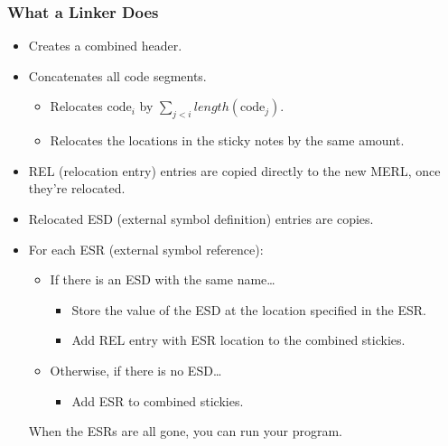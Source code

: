 \documentclass[]{article}
\theoremstyle{definition}
\begin{document}
			\subsubsection{What a Linker Does}
				\begin{itemize}
					\item Creates a combined header.
					\item Concatenates all code segments.
						\begin{itemize}
							\item Relocates $\text{code}_i$ by $\sum_{j < i} length(\text{code}_j)$.
							\item Relocates the locations in the sticky notes by the same amount.
						\end{itemize}
					\item REL (relocation entry) entries are copied directly to the new MERL, once they're relocated.
					\item Relocated ESD (external symbol definition) entries are copies.
					\item For each ESR (external symbol reference):
						\begin{itemize}
							\item If there is an ESD with the same name\dots
								\begin{itemize}
									\item Store the value of the ESD at the location specified in the ESR.
									\item Add REL entry with ESR location to the combined stickies.
								\end{itemize}
							\item Otherwise, if there is no ESD\dots
								\begin{itemize}
									\item Add ESR to combined stickies.
								\end{itemize}
						\end{itemize}

						When the ESRs are all gone, you can run your program.
				\end{itemize}
\end{document}
